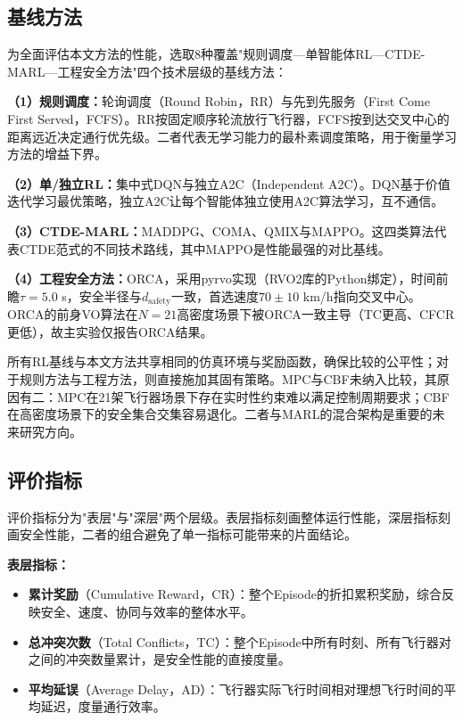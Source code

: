 \documentclass[12pt,a4paper,UTF8]{ctexbook}
\begin{document}
\subsection{基线方法}

为全面评估本文方法的性能，选取8种覆盖"规则调度—单智能体RL—CTDE-MARL—工程安全方法"四个技术层级的基线方法：

\textbf{（1）规则调度：}轮询调度（Round Robin，RR）与先到先服务（First Come First Served，FCFS）。RR按固定顺序轮流放行飞行器，FCFS按到达交叉中心的距离远近决定通行优先级。二者代表无学习能力的最朴素调度策略，用于衡量学习方法的增益下界。

\textbf{（2）单/独立RL：}集中式DQN与独立A2C（Independent A2C）。DQN基于价值迭代学习最优策略，独立A2C让每个智能体独立使用A2C算法学习，互不通信。

\textbf{（3）CTDE-MARL：}MADDPG\cite{ref34}、COMA\cite{ref35}、QMIX\cite{ref33}与MAPPO\cite{ref36}。这四类算法代表CTDE范式的不同技术路线，其中MAPPO是性能最强的对比基线。

\textbf{（4）工程安全方法：}ORCA\cite{ref4}，采用pyrvo实现（RVO2库的Python绑定），时间前瞻$\tau=5.0$ s，安全半径与$d_{\text{safety}}$一致，首选速度$70\pm10$ km/h指向交叉中心。ORCA的前身VO算法在$N=21$高密度场景下被ORCA一致主导（TC更高、CFCR更低），故主实验仅报告ORCA结果。

所有RL基线与本文方法共享相同的仿真环境与奖励函数，确保比较的公平性；对于规则方法与工程方法，则直接施加其固有策略。MPC与CBF未纳入比较，其原因有二：MPC在21架飞行器场景下存在实时性约束难以满足控制周期要求；CBF在高密度场景下的安全集合交集容易退化。二者与MARL的混合架构是重要的未来研究方向。

\subsection{评价指标}

评价指标分为"表层"与"深层"两个层级。表层指标刻画整体运行性能，深层指标刻画安全性能，二者的组合避免了单一指标可能带来的片面结论。

\textbf{表层指标：}
\begin{itemize}
    \item \textbf{累计奖励}（Cumulative Reward，CR）：整个Episode的折扣累积奖励，综合反映安全、速度、协同与效率的整体水平。
    \item \textbf{总冲突次数}（Total Conflicts，TC）：整个Episode中所有时刻、所有飞行器对之间的冲突数量累计，是安全性能的直接度量。
    \item \textbf{平均延误}（Average Delay，AD）：飞行器实际飞行时间相对理想飞行时间的平均延迟，度量通行效率。
\end{itemize}
\end{document}
